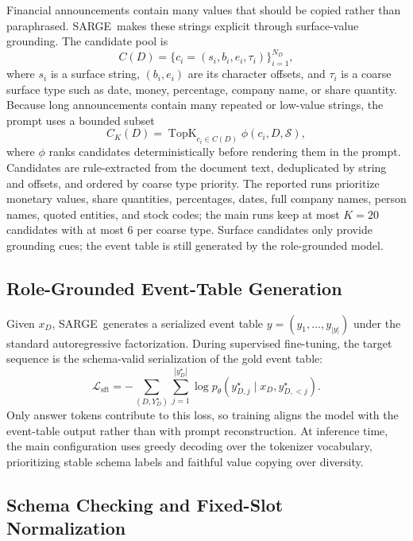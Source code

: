 \documentclass[runningheads]{llncs}
\newcommand{\method}{SARGE}
\begin{document}
Financial announcements contain many values that should be copied rather than paraphrased. \method\ makes these strings explicit through surface-value grounding. The candidate pool is
\begin{equation}
C(D)=\{c_i=(s_i,b_i,e_i,\tau_i)\}_{i=1}^{N_D},
\label{eq:candidate-pool}
\end{equation}
where $s_i$ is a surface string, $(b_i,e_i)$ are its character offsets, and $\tau_i$ is a coarse surface type such as date, money, percentage, company name, or share quantity. Because long announcements contain many repeated or low-value strings, the prompt uses a bounded subset
\begin{equation}
C_K(D)=\operatorname{TopK}_{c_i\in C(D)}\phi(c_i,D,\mathcal{S}),
\label{eq:candidate-selection}
\end{equation}
where $\phi$ ranks candidates deterministically before rendering them in the prompt. Candidates are rule-extracted from the document text, deduplicated by string and offsets, and ordered by coarse type priority. The reported runs prioritize monetary values, share quantities, percentages, dates, full company names, person names, quoted entities, and stock codes; the main runs keep at most $K{=}20$ candidates with at most 6 per coarse type. Surface candidates only provide grounding cues; the event table is still generated by the role-grounded model.

\subsection{Role-Grounded Event-Table Generation}

Given $x_D$, \method\ generates a serialized event table $y=(y_1,\ldots,y_{|y|})$ under the standard autoregressive factorization. During supervised fine-tuning, the target sequence is the schema-valid serialization of the gold event table:
\begin{equation}
\mathcal{L}_{\mathrm{sft}}
=-\sum_{(D,Y_D^{\star})}\sum_{j=1}^{|y_D^{\star}|}
\log p_{\theta}(y_{D,j}^{\star}\mid x_D,y_{D,<j}^{\star}).
\label{eq:sft-loss}
\end{equation}
Only answer tokens contribute to this loss, so training aligns the model with the event-table output rather than with prompt reconstruction. At inference time, the main configuration uses greedy decoding over the tokenizer vocabulary, prioritizing stable schema labels and faithful value copying over diversity.

\subsection{Schema Checking and Fixed-Slot Normalization}
\end{document}

